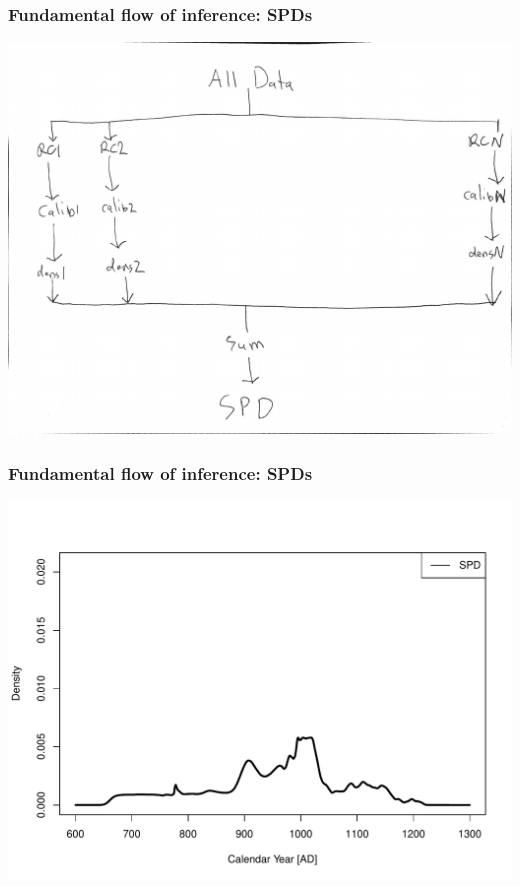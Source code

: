 \documentclass{beamer}
\begin{document}
\begin{frame}[t]
  \frametitle{Fundamental flow of inference: SPDs}
    \includegraphics[height=.85\textheight]{spd_flow.pdf}
\end{frame}

\begin{frame}[t]
  \frametitle{Fundamental flow of inference: SPDs}
    \includegraphics[height=.85\textheight]{sim_spd_10000.pdf}
\end{frame}
\end{document}
